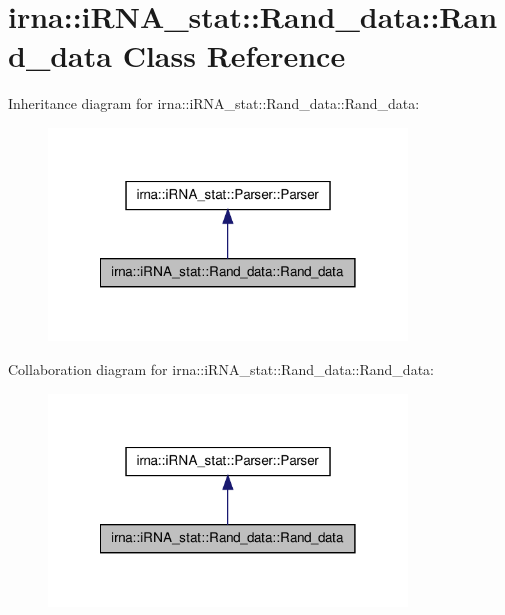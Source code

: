 \hypertarget{classirna_1_1iRNA__stat_1_1Rand__data_1_1Rand__data}{
\section{irna\-:\-:i\-R\-N\-A\-\_\-stat\-:\-:\-Rand\-\_\-data\-:\-:\-Rand\-\_\-data \-Class \-Reference}
\label{classirna_1_1iRNA__stat_1_1Rand__data_1_1Rand__data}
}


\-Inheritance diagram for irna\-:\-:i\-R\-N\-A\-\_\-stat\-:\-:\-Rand\-\_\-data\-:\-:\-Rand\-\_\-data\-:\nopagebreak
\begin{figure}[H]
\begin{center}
\leavevmode
\includegraphics[width=270pt]{classirna_1_1iRNA__stat_1_1Rand__data_1_1Rand__data__inherit__graph}
\end{center}
\end{figure}


\-Collaboration diagram for irna\-:\-:i\-R\-N\-A\-\_\-stat\-:\-:\-Rand\-\_\-data\-:\-:\-Rand\-\_\-data\-:\nopagebreak
\begin{figure}[H]
\begin{center}
\leavevmode
\includegraphics[width=270pt]{classirna_1_1iRNA__stat_1_1Rand__data_1_1Rand__data__coll__graph}
\end{center}
\end{figure}
